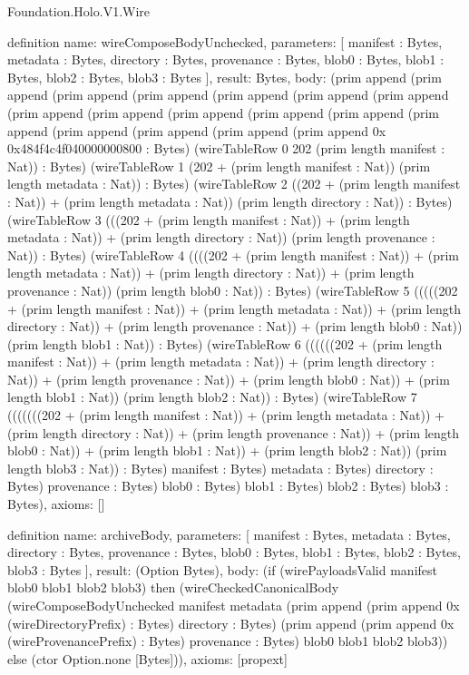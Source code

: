 \begin{lexlean}{Foundation.Holo.V1.Wire}
\begin{semanticmodule}
definition{
  name: wireComposeBodyUnchecked,
  parameters: [
    manifest : Bytes,
    metadata : Bytes,
    directory : Bytes,
    provenance : Bytes,
    blob0 : Bytes,
    blob1 : Bytes,
    blob2 : Bytes,
    blob3 : Bytes
  ],
  result: Bytes,
  body: (prim append (prim append (prim append (prim append (prim append (prim append (prim append (prim append (prim append (prim append (prim append (prim append (prim append (prim append (prim append (prim append (prim append 0x 0x484f4c4f040000000800 : Bytes) (wireTableRow 0 202 (prim length manifest : Nat)) : Bytes) (wireTableRow 1 (202 + (prim length manifest : Nat)) (prim length metadata : Nat)) : Bytes) (wireTableRow 2 ((202 + (prim length manifest : Nat)) + (prim length metadata : Nat)) (prim length directory : Nat)) : Bytes) (wireTableRow 3 (((202 + (prim length manifest : Nat)) + (prim length metadata : Nat)) + (prim length directory : Nat)) (prim length provenance : Nat)) : Bytes) (wireTableRow 4 ((((202 + (prim length manifest : Nat)) + (prim length metadata : Nat)) + (prim length directory : Nat)) + (prim length provenance : Nat)) (prim length blob0 : Nat)) : Bytes) (wireTableRow 5 (((((202 + (prim length manifest : Nat)) + (prim length metadata : Nat)) + (prim length directory : Nat)) + (prim length provenance : Nat)) + (prim length blob0 : Nat)) (prim length blob1 : Nat)) : Bytes) (wireTableRow 6 ((((((202 + (prim length manifest : Nat)) + (prim length metadata : Nat)) + (prim length directory : Nat)) + (prim length provenance : Nat)) + (prim length blob0 : Nat)) + (prim length blob1 : Nat)) (prim length blob2 : Nat)) : Bytes) (wireTableRow 7 (((((((202 + (prim length manifest : Nat)) + (prim length metadata : Nat)) + (prim length directory : Nat)) + (prim length provenance : Nat)) + (prim length blob0 : Nat)) + (prim length blob1 : Nat)) + (prim length blob2 : Nat)) (prim length blob3 : Nat)) : Bytes) manifest : Bytes) metadata : Bytes) directory : Bytes) provenance : Bytes) blob0 : Bytes) blob1 : Bytes) blob2 : Bytes) blob3 : Bytes),
  axioms: []
}

definition{
  name: archiveBody,
  parameters: [
    manifest : Bytes,
    metadata : Bytes,
    directory : Bytes,
    provenance : Bytes,
    blob0 : Bytes,
    blob1 : Bytes,
    blob2 : Bytes,
    blob3 : Bytes
  ],
  result: (Option Bytes),
  body: (if (wirePayloadsValid manifest blob0 blob1 blob2 blob3) then (wireCheckedCanonicalBody (wireComposeBodyUnchecked manifest metadata (prim append (prim append 0x (wireDirectoryPrefix) : Bytes) directory : Bytes) (prim append (prim append 0x (wireProvenancePrefix) : Bytes) provenance : Bytes) blob0 blob1 blob2 blob3)) else (ctor Option.none [Bytes])),
  axioms: [propext]
}


\end{semanticmodule}
\end{lexlean}
